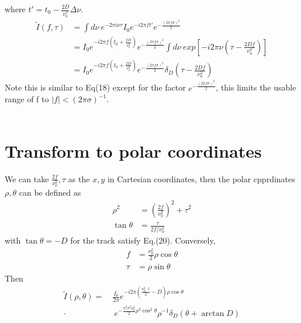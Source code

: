 \documentclass[twocolumn]{aastex61}
\begin{document}
where $t'=t_0 - \frac{2D}{\nu _0 ^3}\Delta \nu$.  
\begin{equation}
\begin{aligned}
\widetilde{I}(f,\tau)  & = \int d\nu~ e^{-2\pi i\nu \tau}I_0  e^{-i2\pi ft'}e^{-\frac{(2\pi f\sigma)^2}{2}} \\
&= I_0e^{-i2\pi f(t_0 + \frac{2D}{\nu _0 ^2})}e^{-\frac{(2\pi f\sigma)^2}{2}}\int d\nu~exp[-i2\pi\nu(\tau - \frac{2Df}{\nu ^3_0})] \\
&= {I_0} e^{-i2\pi f(t_0+\frac{2D}{\nu ^2 _0})}e^{-\frac{(2\pi f\sigma)^2}{2}}\delta _D (\tau - \frac{2Df}{\nu ^3 _0})
\end{aligned}
\end{equation}
Note this is similar to Eq(18) except for the factor $e^{-\frac{(2\pi f \sigma)^2}{2}}$, this limits the usable range of f to $|f|<(2\pi\sigma)^{-1}$.
\\ \\

\section{Transform to polar coordinates}
\label{sec:discussion}
We can take $\frac{2f}{\nu _0 ^2},\tau$ as the $x,y$ in Cartesian coordinates, then the polar cpprdinates $\rho,\theta$ can be defined as 
\begin{equation}
\begin{aligned}
\rho ^2 &= \left(\frac{2f}{\nu _0 ^2}\right) ^2 + \tau ^2 \\
\tan\theta &= \frac{\tau}{2f/\nu ^2 _0} 
\end{aligned}
\end{equation}
with $\tan \theta = -D$ for the track satisfy Eq.(20). Conversely, 
\begin{equation}
\begin{aligned}
f &= \frac{\nu ^2 _0}{2}\rho \cos\theta \\
\tau &= \rho \sin \theta
\end{aligned}
\end{equation}
Then 
\begin{equation}
\begin{aligned}
\widetilde{I}(\rho, \theta) = ~&\frac{I_0}{2\pi}e^{-i2\pi\left(\frac{\nu ^2 _0\cdot t}{2}-D \right)\rho\cos\theta}~\\ 
\cdot & ~e^{-\frac{\pi^2\sigma ^2 \nu _0 ^4}{2}\rho ^2 \cos ^2 \theta}\rho ^{-1} \delta _D (\theta + \arctan D)
\end{aligned}
\end{equation}
\end{document}
